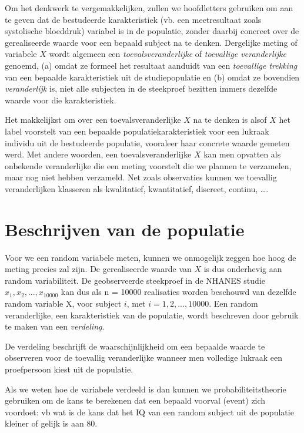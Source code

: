 \documentclass[
  12pt,dutch,coursenotes]{book}
\theoremstyle{definition}
\theoremstyle{definition}
\theoremstyle{definition}
\theoremstyle{remark}
\begin{document}
Om het denkwerk te vergemakkelijken, zullen we hoofdletters gebruiken om aan te geven dat
de bestudeerde karakteristiek (vb. een meetresultaat zoals systolische bloeddruk) variabel is in de populatie,
zonder daarbij concreet over de gerealiseerde waarde
voor een bepaald subject na te denken.
Dergelijke meting of variabele \(X\) wordt
algemeen een \emph{toevalsveranderlijke} of \emph{toevallige veranderlijke} genoemd, (a) omdat ze formeel het
resultaat aanduidt van een \emph{toevallige trekking} van een bepaalde
karakteristiek uit de studiepopulatie en (b) omdat ze bovendien \emph{veranderlijk} is,
niet alle subjecten in de steekproef bezitten immers dezelfde waarde
voor die karakteristiek.

Het makkelijkst om over een toevalsveranderlijke \(X\) na te denken is alsof \(X\) het label voorstelt van
een bepaalde populatiekarakteristiek voor een lukraak individu uit de
bestudeerde populatie, vooraleer haar concrete waarde gemeten werd.
Met andere woorden, een toevalsveranderlijke \(X\) kan men opvatten als onbekende veranderlijke die een meting voorstelt die we plannen te verzamelen, maar nog niet hebben verzameld.
Net zoals observaties kunnen we toevallig veranderlijken klasseren als kwalitatief, kwantitatief, discreet, continu, \ldots.

\hypertarget{beschrijven-van-de-populatie}{%
\section{Beschrijven van de populatie}\label{beschrijven-van-de-populatie}}

Voor we een random variabele meten, kunnen we onmogelijk zeggen hoe hoog de meting precies zal zijn.
De gerealiseerde waarde van \(X\) is dus onderhevig aan random variabiliteit.
De geobserveerde steekproef in de NHANES studie \(x_1, x_2, . . . , x_{10000}\) kan dus als n = 10000 realisaties worden beschouwd van dezelfde random variable X, voor subject \(i\), met \(i = 1,2,...,10000\).
Een random veranderlijke, een karakteristiek van de populatie, wordt beschreven door gebruik te maken van een \emph{verdeling}.

De verdeling beschrijft de waarschijnlijkheid om een bepaalde waarde te observeren voor de toevallig veranderlijke wanneer men volledige lukraak een proefpersoon kiest uit de populatie.

Als we weten hoe de variabele verdeeld is dan kunnen we probabiliteitstheorie gebruiken om de kans te berekenen dat een bepaald voorval (event) zich voordoet: vb wat is de kans dat het IQ van een random subject uit de populatie kleiner of gelijk is aan 80.
\end{document}
